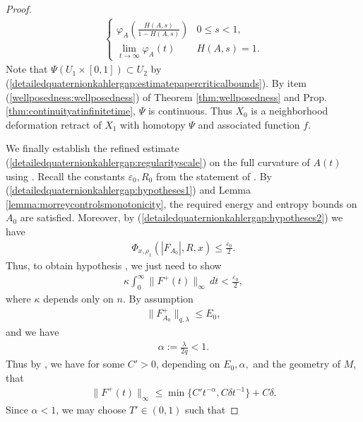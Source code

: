 \documentclass[12pt]{amsart}
\renewcommand{\1}{{\mathbf 1}}
\theoremstyle{others}
\numberwithin{equation}{section}
\begin{document}
\begin{proof}
\begin{align*}
\begin{cases}
            \varphi_A\left(\frac{H(A, s)}{1-H(A, s)}\right) & 0 \leq s < 1, \\
            \lim_{t \to \infty} \varphi_A(t) & H(A, s) = 1.
        \end{cases}
    \end{align*} Note that \(\Psi(U_1 \times [0, 1]) \subset U_2\) by (\ref{detailedquaternionkahlergap:estimatepapercriticalbounds}). By item (\ref{wellposedness:wellposedness}) of Theorem \ref{thm:wellposedness} and Prop. \ref{thm:continuityatinfinitetime}, \(\Psi\) is continuous. Thus \(X_0\) is a neighborhood deformation retract of \(X_1\) with homotopy \(\Psi\) and associated function \(f\). \par 
    We finally establish the refined estimate (\ref{detailedquaternionkahlergap:regularityscale}) on the full curvature of \(A(t)\) using \cite[Theorem 6.2]{oliveirawaldron}. Recall the constants \(\varepsilon_0, R_0\) from the statement of \cite[Theorem 6.2]{oliveirawaldron}. By (\ref{detailedquaternionkahlergap:hypotheses1}) and Lemma \ref{lemma:morreycontrolsmonotonicity}, %
    the required energy and entropy bounds on $A_0$ \cite[(6.7-8)]{oliveirawaldron} are satisfied. Moreover, by (\ref{detailedquaternionkahlergap:hypotheses2}) we have
    \begin{align*}
        \Phi_{x, \rho_1}(|F_{A_0}|, R, x) \leq \frac{\varepsilon_0}{2}.
    \end{align*} Thus, to obtain hypothesis \cite[(6.9)]{oliveirawaldron}, we just need to show
    \begin{align*}
        \kappa \int_0^\infty \|F^+(t)\|_\infty \, dt < \frac{\varepsilon_0}{2},
    \end{align*} where \(\kappa\) depends only on \(n\). By assumption
    \begin{align*}
        \|F_{A_0}^+\|_{q, \lambda} \leq E_0,
    \end{align*} and we have
    \begin{align*}
        \alpha := \frac{\lambda}{2q} < 1.
    \end{align*} Thus by \cite[(1.7)]{estimatespaper}, we have for some \(C' > 0\), depending on \(E_0, \alpha,\) and the geometry of \(M\), that
    \begin{align*}
        \|F^+(t)\|_{\infty} \leq \min\{C't^{-\alpha}, C\delta t^{-1}\} + C\delta. 
    \end{align*}  Since \(\alpha < 1\), we may choose \(T' \in (0, 1)\) such that 

\end{proof}
\end{document}
